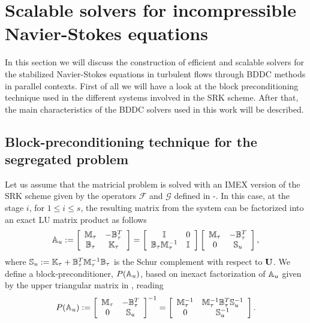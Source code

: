 \section{Scalable solvers for incompressible Navier-Stokes equations}
\label{sec-C7_solver}
In this section we will discuss the construction of efficient and scalable solvers for the stabilized Navier-Stokes equations in turbulent flows through BDDC methods in parallel contexts. First of all we will have a look at the block preconditioning technique used in the different systems involved in the SRK scheme. After that, the main characteristics of the BDDC solvers used in this work will be described.

\subsection{Block-preconditioning technique for the segregated problem}
\label{subsec-C7_block_prec}
Let us assume that the matricial problem  is solved with an IMEX version of the SRK scheme given by the operators $ \mathcal{F} $ and $ \mathcal{G} $ defined in -. In this case, at the stage $ i $, for $ 1\le i \le s $, the resulting matrix from the system  can be factorized into an exact LU matrix product as follows
\begin{equation}
\label{eq-C7_SRK_u_mat}
\mathbb{A}_u:=\left[\begin{array}{cc}
\mathbb{M}_\tau&-\mathbb{B}_\tau^T\\
\mathbb{B}_\tau&\mathbb{K}_\tau
\end{array}\right]=\left[\begin{array}{cc}
\mathbb{I}&0\\
\mathbb{B}_\tau\mathbb{M}_\tau^{-1}&\mathbb{I}
\end{array}\right]\left[\begin{array}{cc}
\mathbb{M}_\tau&-\mathbb{B}_\tau^T\\
0&\mathbb{S}_u
\end{array}\right],
\end{equation}
where $ \mathbb{S}_u:=\mathbb{K}_\tau+\mathbb{B}_\tau^T\mathbb{M}_\tau^{-1}\mathbb{B}_\tau$ is the Schur complement with respect to ${\bf U}$. We define a block-preconditioner, $ P(\mathbb{A}_u) $, based on inexact factorization of $ \mathbb{A}_u $ given by the upper triangular matrix in , reading
\begin{equation}
\label{eq-C7_SRK_u_prec}
P(\mathbb{A}_u):=\left[\begin{array}{cc}
\mathbb{M}_\tau&-\mathbb{B}_\tau^T\\
0&\mathbb{S}_u
\end{array}\right]^{-1}=\left[\begin{array}{cc}
\mathbb{M}_\tau^{-1}&\mathbb{M}_\tau^{-1}\mathbb{B}_\tau^T\mathbb{S}_u^{-1}\\
0&\mathbb{S}_u^{-1}
\end{array}\right].
\end{equation}

